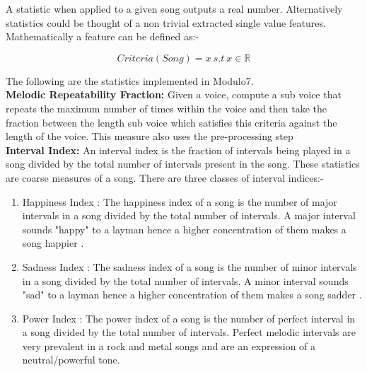 \noindent A statistic when applied to a given song outputs a real number. Alternatively statistics could be thought of a non trivial extracted single value features. Mathematically a feature can be defined as:-

\begin{equation}
Criteria(Song) = x \ s.t \ x \in \mathbb{R}
\end{equation}

\noindent The following are the statistics implemented in Modulo7. \\

\noindent \textbf{Melodic Repeatability Fraction: } Given a voice, compute a sub voice that repeats the maximum number of times within the voice and then take the fraction between the length sub voice which satisfies this criteria against the length of the voice. This measure also uses the pre-processing step \\

\noindent \textbf{Interval Index: } An interval index is the fraction of intervals being played in a song divided by the total number of intervals present in the song. These statistics are coarse measures of a song. There are three classes of interval indices:-

\begin{enumerate}
\item Happiness Index : The happiness index of a song is the number of major intervals in a song divided by the total number of intervals. A major interval sounds "happy" to a layman hence a higher concentration of them makes a song happier \cite{majorvsminorintervals}. 
\item Sadness Index : The sadness index of a song is the number of minor intervals \cite{minorintervalssad}  in a song divided by the total number of intervals. A minor interval sounds "sad" to a layman hence a higher concentration of them makes a song sadder \cite{majorvsminorintervals}. 
\item Power Index : The power index of a song is the number of perfect interval in a song divided by the total number of intervals. Perfect melodic intervals are very prevalent in a rock and metal songs and are an expression of a neutral/powerful tone. 
\end{enumerate}